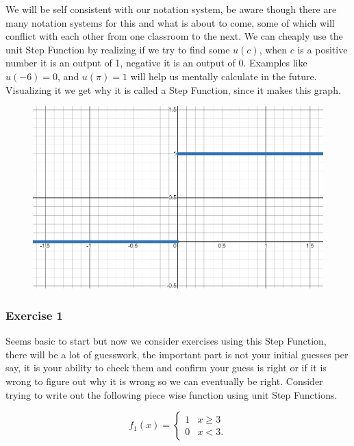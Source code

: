 \documentclass[12pt]{article}
\begin{document}
We will be self consistent with our notation system, be aware though there are many notation systems for this and what is about to come, some of which will conflict with each other from one classroom to the next. We can cheaply use the unit Step Function by realizing if we try to find some $u(c)$, when $c$ is a positive number it is an output of 1, negative it is an output of 0. Examples like $u(-6)=0$, and $u(\pi)=1$ will help us mentally calculate in the future. Visualizing it we get why it is called a Step Function, since it makes this graph.

\begin{figure}[!htbp]
\centering
\includegraphics[scale=.4]{step.PNG}
\label{fig:hsf}
\end{figure}

\subsubsection{Exercise 1}

Seems basic to start but now we consider exercises using this Step Function, there will be a lot of guesswork, the important part is not your initial guesses per say, it is your ability to check them and confirm your guess is right or if it is wrong to figure out why it is wrong so we can eventually be right. Consider trying to write out the following piece wise function using unit Step Functions. 

\begin{equation*}
    f_1(x)=\left\{
        \begin{array}{rl}
            1 &  x \geq 3  \\
            0 &  x < 3.
        \end{array}
    \right.
\end{equation*}
\end{document}
